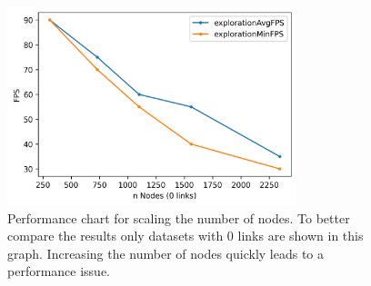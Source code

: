 \begin{table}[!hbt]
     \caption{Results from the performance evaluation, separated into duration of the layout phase in seconds and render performance in FPS during the exploration phase. Test setup: Ryzen 7 3700X + Radeon RX 590.}
     \label{table:resultFPS}
\end{table}

\begin{figure}[!hbt]
    \centering
    \includegraphics[width=0.75\textwidth]{graphics/performanceAnalysisNodes2.png}
    \caption{Performance chart for scaling the number of nodes. To better compare the results only datasets with 0 links are shown in this graph. Increasing the number of nodes quickly leads to a performance issue.} 
    \label{fig:performanceNodes} 
\end{figure}

